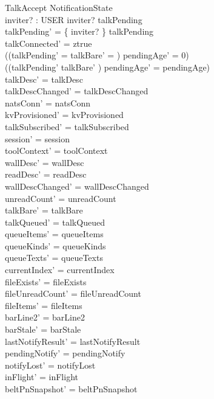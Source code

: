 \documentclass[a4paper,10pt,fleqn]{article}
\begin{document}
\begin{schema}{TalkAccept}
  \Delta NotificationState \\
  inviter? : USER
  \where
  inviter? \in \dom talkPending \\
  talkPending' = \{ inviter? \} \ndres talkPending \\
  talkConnected' = ztrue \\
  ((\dom talkPending' = \emptyset \land talkBare' = \emptyset) \implies
  pendingAge' = 0) \\
  ((\dom talkPending' \neq \emptyset \lor talkBare' \neq \emptyset) \implies
  pendingAge' = pendingAge) \\
  talkDesc' = talkDesc \\
  talkDescChanged' = talkDescChanged \\
  natsConn' = natsConn \\
  kvProvisioned' = kvProvisioned \\
  talkSubscribed' = talkSubscribed \\
  session' = session \\
  toolContext' = toolContext \\
  wallDesc' = wallDesc \\
  readDesc' = readDesc \\
  wallDescChanged' = wallDescChanged \\
  unreadCount' = unreadCount \\
  talkBare' = talkBare \\
  talkQueued' = talkQueued \\
  queueItems' = queueItems \\
  queueKinds' = queueKinds \\
  queueTexts' = queueTexts \\
  currentIndex' = currentIndex \\
  fileExists' = fileExists \\
  fileUnreadCount' = fileUnreadCount \\
  fileItems' = fileItems \\
  barLine2' = barLine2 \\
  barStale' = barStale \\
  lastNotifyResult' = lastNotifyResult \\
  pendingNotify' = pendingNotify \\
  notifyLost' = notifyLost \\
  inFlight' = inFlight \\
  beltPnSnapshot' = beltPnSnapshot \\

\end{schema}
\end{document}
